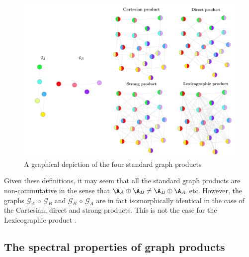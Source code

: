 \begin{figure}[t]
    \begin{center}
        \includegraphics[width=\linewidth]{Figures/product_graphs.pdf}
    \end{center}
    \caption[Graphical depiction of the standard graph products]{A graphical depiction of the four standard graph products}
    \label{fig:graph_products}
\end{figure}




Given these definitions, it may seem that all the standard graph products are non-commutative in the sense that $\A_A \oplus \A_B  \neq \A_B \oplus \A_A $ etc. However, the graphs $\mathcal{G}_A \, \diamond \, \mathcal{G}_B$ and $\mathcal{G}_B \, \diamond \, \mathcal{G}_A$ are in fact isomorphically identical in the case of the Cartesian, direct and strong products. This is not the case for the Lexicographic product \citep{Imrich2000}.

\subsection{The spectral properties of graph products}

